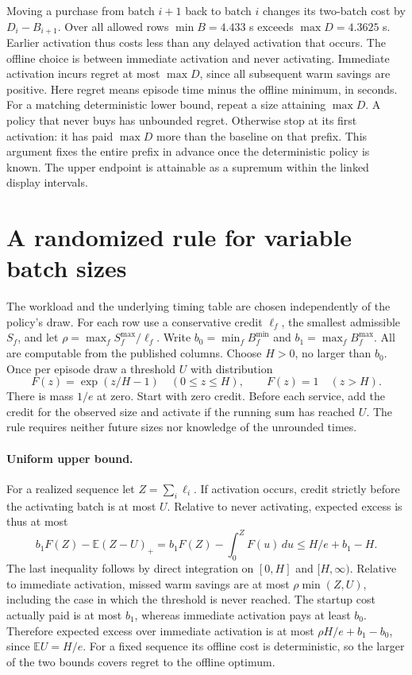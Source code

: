 \documentclass[11pt]{article}
\begin{document}
Moving a purchase from batch $i+1$ back to batch $i$ changes its two-batch cost by $D_i-B_{i+1}$. Over all allowed rows $\min B=4.433$ s exceeds $\max D=4.3625$ s. Earlier activation thus costs less than any delayed activation that occurs. The offline choice is between immediate activation and never activating. Immediate activation incurs regret at most $\max D$, since all subsequent warm savings are positive. Here regret means episode time minus the offline minimum, in seconds. For a matching deterministic lower bound, repeat a size attaining $\max D$. A policy that never buys has unbounded regret. Otherwise stop at its first activation: it has paid $\max D$ more than the baseline on that prefix. This argument fixes the entire prefix in advance once the deterministic policy is known. The upper endpoint is attainable as a supremum within the linked display intervals.

\section{A randomized rule for variable batch sizes}
The workload and the underlying timing table are chosen independently of the policy's draw. For each row use a conservative credit $\ell_f$, the smallest admissible $S_f$, and let $\rho=\max_f S_f^{\max}/\ell_f$. Write $b_0=\min_f B_f^{\min}$ and $b_1=\max_f B_f^{\max}$. All are computable from the published columns. Choose $H>0$, no larger than $b_0$. Once per episode draw a threshold $U$ with distribution
\[
 F(z)=\exp(z/H-1)\quad(0\le z\le H),\qquad F(z)=1\quad(z>H).
\]
There is mass $1/e$ at zero. Start with zero credit. Before each service, add the credit for the observed size and activate if the running sum has reached $U$. The rule requires neither future sizes nor knowledge of the unrounded times.

\paragraph{Uniform upper bound.}
For a realized sequence let $Z=\sum_i\ell_i$. If activation occurs, credit strictly before the activating batch is at most $U$. Relative to never activating, expected excess is thus at most
\[
 b_1 F(Z)-\mathbb{E}(Z-U)_+
 = b_1 F(Z)-\int_0^Z F(u)\,du\le H/e+b_1-H.
\]
The last inequality follows by direct integration on $[0,H]$ and $[H,\infty)$. Relative to immediate activation, missed warm savings are at most $\rho\min(Z,U)$, including the case in which the threshold is never reached. The startup cost actually paid is at most $b_1$, whereas immediate activation pays at least $b_0$. Therefore expected excess over immediate activation is at most $\rho H/e+b_1-b_0$, since $\mathbb E U=H/e$. For a fixed sequence its offline cost is deterministic, so the larger of the two bounds covers regret to the offline optimum.
\end{document}
